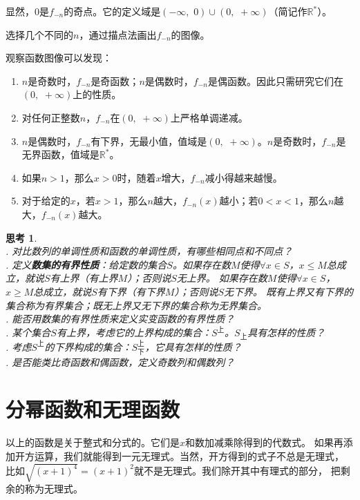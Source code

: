 \documentclass[12pt,UTF8]{ctexbook}
\newtheorem{sk}{思考}[section]
\begin{document}
显然，$0$是$f_{-n}$的奇点。它的定义域是$(-\infty,\,\, 0)\cup(0, \,\, +\infty)$（简记作$\mathbb{R}^*$）。

选择几个不同的$n$，通过描点法画出$f_{-n}$的图像。


观察函数图像可以发现：
\begin{enumerate}
    \item $n$是奇数时，$f_{-n}$是奇函数；$n$是偶数时，$f_{-n}$是偶函数。因此只需研究它们在$(0, \,\, +\infty)$上的性质。
    \item 对任何正整数$n$，$f_{-n}$在$(0, \,\, +\infty)$上严格单调递减。
    \item $n$是偶数时，$f_{-n}$有下界，无最小值，值域是$(0, \,\, +\infty)$。$n$是奇数时，$f_{-n}$是无界函数，值域是$\mathbb{R}^*$。
    \item 如果$n>1$，那么$x>0$时，随着$x$增大，$f_{-n}$减小得越来越慢。
    \item 对于给定的$x$，若$x>1$，那么$n$越大，$f_{-n}(x)$越小；若$0 < x<1$，那么$n$越大，$f_{-n}(x)$越大。
\end{enumerate}

\begin{sk}
    \mbox{} \\
    . 对比数列的单调性质和函数的单调性质，有哪些相同点和不同点？\\
    . 定义\textbf{数集的有界性质}：给定数的集合$S$。如果存在数$M$使得$\forall x \in S$，$x \leqslant M$总成立，就说$S$有上界（有上界$M$）；否则说$S$无上界。
    如果存在数$M$使得$\forall x \in S$，$x \geqslant M$总成立，就说$S$有下界（有下界$M$）；否则说$S$无下界。
    既有上界又有下界的集合称为有界集合；既无上界又无下界的集合称为无界集合。\\
    . 能否用数集的有界性质来定义实变函数的有界性质？\\
    . 某个集合$S$有上界，考虑它的上界构成的集合：$S^{\text{上}}$。$S_{\text{上}}$具有怎样的性质？\\
    . 考虑$S^{\text{上}}$的下界构成的集合：$S^{\text{上}}_{\text{下}}$，它具有怎样的性质？\\
    . 是否能类比奇函数和偶函数，定义奇数列和偶数列？
\end{sk}

\section{分幂函数和无理函数}
以上的函数是关于整式和分式的。它们是$x$和数加减乘除得到的代数式。
如果再添加开方运算，我们就能得到一元无理式。当然，开方得到的式子不总是无理式，
比如$\sqrt{(x+1)^4} = (x+1)^2$就不是无理式。我们除开其中有理式的部分，
把剩余的称为无理式。
\end{document}
